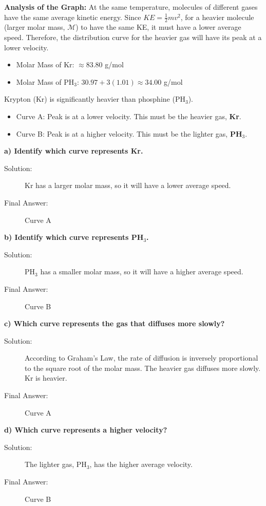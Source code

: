 \documentclass{article}
\begin{document}
\textbf{Analysis of the Graph:}
At the same temperature, molecules of different gases have the same average kinetic energy. Since $KE = \frac{1}{2}mv^2$, for a heavier molecule (larger molar mass, $\mathcal{M}$) to have the same KE, it must have a lower average speed. Therefore, the distribution curve for the heavier gas will have its peak at a lower velocity.
\begin{itemize}
    \item Molar Mass of Kr: $\approx 83.80$ g/mol
    \item Molar Mass of PH$_3$: $30.97 + 3(1.01) \approx 34.00$ g/mol
\end{itemize}
Krypton (Kr) is significantly heavier than phosphine (PH$_3$).
\begin{itemize}
    \item Curve A: Peak is at a lower velocity. This must be the heavier gas, \textbf{Kr}.
    \item Curve B: Peak is at a higher velocity. This must be the lighter gas, \textbf{PH$_3$}.
\end{itemize}

\textbf{a) Identify which curve represents Kr.}
\begin{description}
    \item[Solution:] Kr has a larger molar mass, so it will have a lower average speed.
    \item[Final Answer:] Curve A
\end{description}

\textbf{b) Identify which curve represents PH$_3$.}
\begin{description}
    \item[Solution:] PH$_3$ has a smaller molar mass, so it will have a higher average speed.
    \item[Final Answer:] Curve B
\end{description}

\textbf{c) Which curve represents the gas that diffuses more slowly?}
\begin{description}
    \item[Solution:] According to Graham's Law, the rate of diffusion is inversely proportional to the square root of the molar mass. The heavier gas diffuses more slowly. Kr is heavier.
    \item[Final Answer:] Curve A
\end{description}

\textbf{d) Which curve represents a higher velocity?}
\begin{description}
    \item[Solution:] The lighter gas, PH$_3$, has the higher average velocity.
    \item[Final Answer:] Curve B
\end{description}
\end{document}

